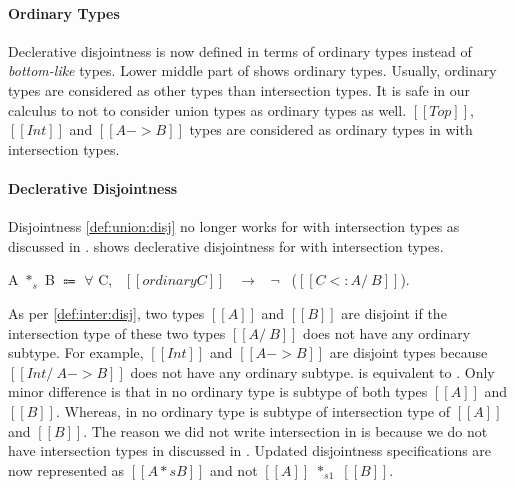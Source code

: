 \paragraph{Ordinary Types}
Declerative disjointness is now defined in terms of ordinary types instead of \emph{bottom-like} types.
Lower middle part of 
 shows ordinary types. Usually, ordinary types are considered as other types than
intersection types. It is safe in our calculus to not to consider union types as ordinary types as well.
$[[Top]]$, $[[Int]]$ and $[[A -> B]]$ types are considered as ordinary types in \cal with intersection
types.

\paragraph{Declerative Disjointness}
Disjointness \cref{def:union:disj} no longer works for \cal with intersection types as discussed in
. 
 shows declerative disjointness for \cal with intersection types.

\begin{definition}
\label{def:inter:disj}
  A $*_s$ B $\Coloneqq$ $\forall$ C, \ $[[ordinary C]]$ \ $\rightarrow$ \ $\neg$ \ ($[[C <: A /\ B]]$).
\end{definition}

\noindent As per \cref{def:inter:disj}, two types $[[A]]$ and $[[B]]$ are disjoint if the intersection type
of these two types $[[A /\ B]]$ does not have any ordinary subtype. For example, $[[Int]]$ and 
$[[A -> B]]$ are disjoint types because $[[Int /\ A -> B]]$ does not have any ordinary subtype.
 is equivalent to . Only minor difference is that
in  no ordinary type is subtype of both types $[[A]]$ and $[[B]]$. Whereas,
in  no ordinary type is subtype of intersection type of $[[A]]$ and $[[B]]$.
The reason we did not write intersection in  is because we do not have
intersection types in \cal discussed in . Updated disjointness specifications are
now represented as $[[A *s B]]$ and not $[[A]]$ $*_{s1}$ $[[B]]$.

